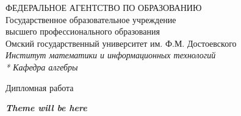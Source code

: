 \begin{titlepage}
	\newpage

	\begin{center}
	    ФЕДЕРАЛЬНОЕ АГЕНТСТВО ПО ОБРАЗОВАНИЮ \\
	    \vspace{3mm}
    	Государственное образовательное учреждение \\
		высшего профессионального образования\\
	    \vspace{3mm}
		Омский государственный университет им. Ф.М. Достоевского\\
	    \vspace{3mm}
	    \textit{Институт математики и информационных технологий \\*
		       Кафедра алгебры}
	\end{center}

	\vfill\vfill\vfill\vfill
	\begin{center}
		\Large{Дипломная работа}
	\end{center}
	\vfill

	\begin{center}
		\Large\textbf{\textit{Theme will be here}}
	\end{center}


	
	\vfill\vfill\vfill\vfill
	
	\begin{singlespace}
    \large {
        {}

        {}\hspace{9.5cm}{студент группы МПС-703-О}

        {}\hspace{9.5cm}{специальности <<Прикладная}

        {}\hspace{9.5cm}{математика и информатика>>}

        {}\hspace{9.5cm}{Уляшев П.А.} 
        
        \vspace{2mm}

        {}\hspace{9.5cm}{\underline{{}\hspace{5cm}{}}} \vspace{-0.7mm}

        {}

}
\end{singlespace}
\end{titlepage}
